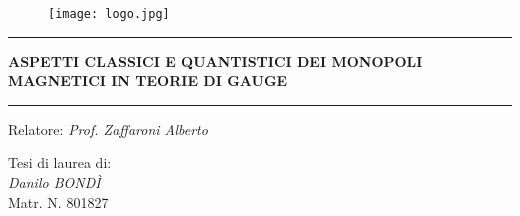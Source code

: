 \begin{titlepage}


\vspace{0.5cm}

\begin{figure}[h]
\centering
\texttt{[image: logo.jpg]}
\end{figure}

\vspace{2cm}
\hrule
\vspace{0.5cm}

\centering\huge\textbf{
   ASPETTI CLASSICI E QUANTISTICI DEI MONOPOLI MAGNETICI IN TEORIE DI GAUGE}

\vspace{0.5cm}
\hrule
\vspace{2cm}

\Large
\raggedright Relatore: \emph{Prof. Zaffaroni Alberto} \par
\begin{table}[h]
\Large
	Tesi di laurea di: \\
	\emph{Danilo BONDÌ} \\
	Matr. N. 801827\\
\end{table}

\vspace{1cm}
\large
\vfill{}

\end{titlepage}



 		\setcounter{page}{2}
         \null
         \thispagestyle{empty}
         \newpage


\tableofcontents
